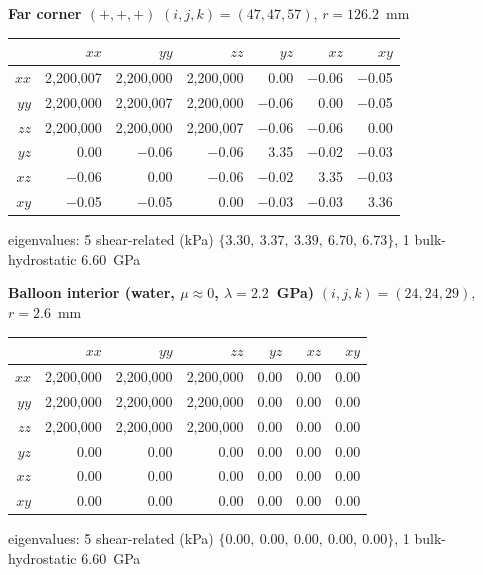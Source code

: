 \documentclass[11pt,letterpaper]{article}
\begin{document}
\textbf{Far corner $(+,+,+)$} \quad $(i,j,k)=(47,47,57)$, $r=126.2$~mm
\begin{center}\scriptsize
\begin{tabular}{r|rrrrrr}
\toprule
 & $xx$ & $yy$ & $zz$ & $yz$ & $xz$ & $xy$ \\
\midrule
$xx$ & \phantom{$-$}2,200,007 & \phantom{$-$}2,200,000 & \phantom{$-$}2,200,000 & \phantom{$-$}0.00 & $-$0.06 & $-$0.05 \\
$yy$ & \phantom{$-$}2,200,000 & \phantom{$-$}2,200,007 & \phantom{$-$}2,200,000 & $-$0.06 & \phantom{$-$}0.00 & $-$0.05 \\
$zz$ & \phantom{$-$}2,200,000 & \phantom{$-$}2,200,000 & \phantom{$-$}2,200,007 & $-$0.06 & $-$0.06 & \phantom{$-$}0.00 \\
$yz$ & \phantom{$-$}0.00 & $-$0.06 & $-$0.06 & \phantom{$-$}3.35 & $-$0.02 & $-$0.03 \\
$xz$ & $-$0.06 & \phantom{$-$}0.00 & $-$0.06 & $-$0.02 & \phantom{$-$}3.35 & $-$0.03 \\
$xy$ & $-$0.05 & $-$0.05 & \phantom{$-$}0.00 & $-$0.03 & $-$0.03 & \phantom{$-$}3.36 \\
\bottomrule
\end{tabular}
\end{center}
\vspace{-4pt}\noindent\hspace{1em}\scriptsize eigenvalues: 5 shear-related (kPa) $\{3.30,\ 3.37,\ 3.39,\ 6.70,\ 6.73\}$, 1 bulk-hydrostatic $6.60$~GPa

\textbf{Balloon interior (water, $\mu \approx 0$, $\lambda = 2.2$~GPa)} \quad $(i,j,k)=(24,24,29)$, $r=2.6$~mm
\begin{center}\scriptsize
\begin{tabular}{r|rrrrrr}
\toprule
 & $xx$ & $yy$ & $zz$ & $yz$ & $xz$ & $xy$ \\
\midrule
$xx$ & \phantom{$-$}2,200,000 & \phantom{$-$}2,200,000 & \phantom{$-$}2,200,000 & \phantom{$-$}0.00 & \phantom{$-$}0.00 & \phantom{$-$}0.00 \\
$yy$ & \phantom{$-$}2,200,000 & \phantom{$-$}2,200,000 & \phantom{$-$}2,200,000 & \phantom{$-$}0.00 & \phantom{$-$}0.00 & \phantom{$-$}0.00 \\
$zz$ & \phantom{$-$}2,200,000 & \phantom{$-$}2,200,000 & \phantom{$-$}2,200,000 & \phantom{$-$}0.00 & \phantom{$-$}0.00 & \phantom{$-$}0.00 \\
$yz$ & \phantom{$-$}0.00 & \phantom{$-$}0.00 & \phantom{$-$}0.00 & \phantom{$-$}0.00 & \phantom{$-$}0.00 & \phantom{$-$}0.00 \\
$xz$ & \phantom{$-$}0.00 & \phantom{$-$}0.00 & \phantom{$-$}0.00 & \phantom{$-$}0.00 & \phantom{$-$}0.00 & \phantom{$-$}0.00 \\
$xy$ & \phantom{$-$}0.00 & \phantom{$-$}0.00 & \phantom{$-$}0.00 & \phantom{$-$}0.00 & \phantom{$-$}0.00 & \phantom{$-$}0.00 \\
\bottomrule
\end{tabular}
\end{center}
\vspace{-4pt}\noindent\hspace{1em}\scriptsize eigenvalues: 5 shear-related (kPa) $\{0.00,\ 0.00,\ 0.00,\ 0.00,\ 0.00\}$, 1 bulk-hydrostatic $6.60$~GPa
\end{document}
